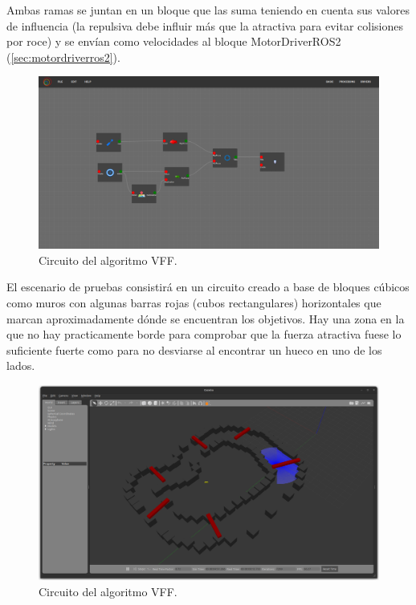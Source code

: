 Ambas ramas se juntan en un bloque que las suma teniendo en cuenta sus valores de influencia (la repulsiva debe influir más que la atractiva para evitar colisiones por
roce) y se envían como velocidades al bloque MotorDriverROS2 (\ref{sec:motordriverros2}).
\begin{figure} [H]
    \begin{center}
        \includegraphics[width=12cm]{figs/c6/VFF_circ.png}
    \end{center}
    \caption[Circuito VFF]{Circuito del algoritmo VFF.}
    \label{fig:VFF_circ}
\end{figure}
El escenario de pruebas consistirá en un circuito creado a base de bloques cúbicos como muros con algunas barras rojas (cubos rectangulares) horizontales que marcan
aproximadamente dónde se encuentran los objetivos. Hay una zona en la que no hay practicamente borde para comprobar que la fuerza atractiva fuese lo suficiente fuerte
como para no desviarse al encontrar un hueco en uno de los lados.

\begin{figure} [H]
    \begin{center}
        \includegraphics[width=12cm]{figs/c6/VFF_world.png}
    \end{center}
    \caption[Circuito VFF]{Circuito del algoritmo VFF.}
    \label{fig:VFF_circ}
\end{figure}


